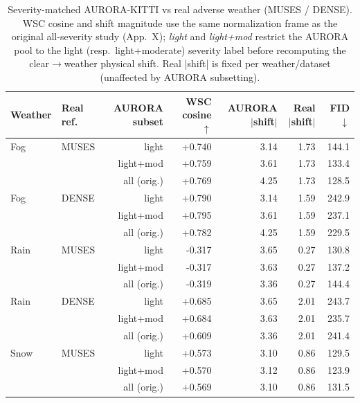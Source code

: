 \begin{table}[t]
\centering
\caption{Severity-matched AURORA-KITTI vs real adverse weather (MUSES / DENSE). WSC cosine and shift magnitude use the same normalization frame as the original all-severity study (App.~X); \emph{light} and \emph{light+mod} restrict the AURORA pool to the light (resp.\ light+moderate) severity label before recomputing the clear$\to$weather physical shift. Real |shift| is fixed per weather/dataset (unaffected by AURORA subsetting).}
\label{tab:severity_realism}
\begin{tabular}{llrrrrr}
\toprule
Weather & Real ref. & AURORA subset & WSC cosine $\uparrow$ & AURORA $|$shift$|$ & Real $|$shift$|$ & FID $\downarrow$ \\
\midrule
Fog & MUSES & light & +0.740 & 3.14 & 1.73 & 144.1 \\
 &  & light+mod & +0.759 & 3.61 & 1.73 & 133.4 \\
 &  & all (orig.) & +0.769 & 4.25 & 1.73 & 128.5 \\
\addlinespace
Fog & DENSE & light & +0.790 & 3.14 & 1.59 & 242.9 \\
 &  & light+mod & +0.795 & 3.61 & 1.59 & 237.1 \\
 &  & all (orig.) & +0.782 & 4.25 & 1.59 & 229.5 \\
\addlinespace
Rain & MUSES & light & -0.317 & 3.65 & 0.27 & 130.8 \\
 &  & light+mod & -0.317 & 3.63 & 0.27 & 137.2 \\
 &  & all (orig.) & -0.319 & 3.36 & 0.27 & 144.4 \\
\addlinespace
Rain & DENSE & light & +0.685 & 3.65 & 2.01 & 243.7 \\
 &  & light+mod & +0.684 & 3.63 & 2.01 & 235.7 \\
 &  & all (orig.) & +0.609 & 3.36 & 2.01 & 241.4 \\
\addlinespace
Snow & MUSES & light & +0.573 & 3.10 & 0.86 & 129.5 \\
 &  & light+mod & +0.570 & 3.12 & 0.86 & 123.9 \\
 &  & all (orig.) & +0.569 & 3.10 & 0.86 & 131.5 \\
\bottomrule
\end{tabular}
\end{table}
